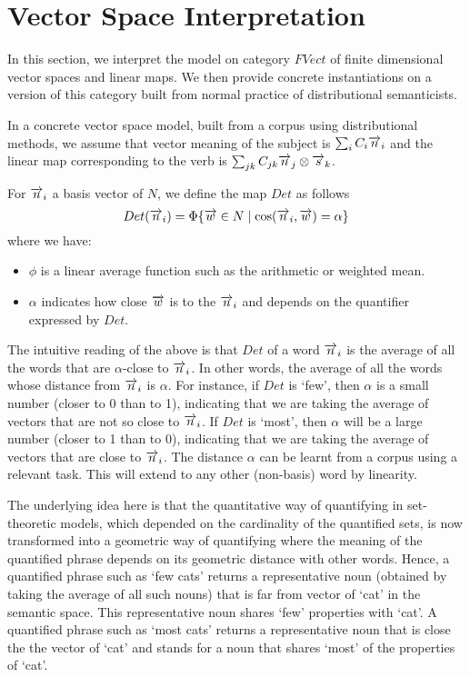 \section{Vector Space Interpretation}


In this section, we interpret the model on category $FVect$ of finite dimensional vector spaces and linear maps. We then provide concrete instantiations on a version of this category built from normal practice of distributional semanticists. 

In a concrete vector space model, built from a corpus using distributional methods, we assume that  vector meaning of the subject is $\sum_i C_i \overrightarrow{n}_i$ and the linear map corresponding to the verb is $\sum_{jk} C_{jk} \overrightarrow{n}_j \otimes \overrightarrow{s}_k$. 

For $\overrightarrow{n}_i$ a basis vector of $N$, we define  the map $Det$  as follows 
\[
Det(\overrightarrow{n}_i) = \Phi \{\overrightarrow{w} \in N \mid \cos(\overrightarrow{n}_i, \overrightarrow{w}) = \alpha\}
\]
where we have:
\begin{itemize}
\item  $\phi$ is a linear average function such as the   arithmetic or weighted mean. 
\item  $\alpha$ indicates how close $\overrightarrow{w}$ is to the $\overrightarrow{n}_i$ and depends on the quantifier expressed by $Det$. 
\end{itemize}

\noindent
The intuitive reading of the above is that $Det$ of a word $\overrightarrow{n}_i$ is the average of all the words that are $\alpha$-close to $\overrightarrow{n}_i$. In other words, the average of all the words  whose distance from $\overrightarrow{n}_i$ is $\alpha$.  For instance, if $Det$ is `few', then $\alpha$ is a small number (closer to 0 than to 1), indicating that we are taking the average of vectors that are not so close to $\overrightarrow{n}_i$. If $Det$ is `most', then $\alpha$ will be a large number (closer to 1 than to 0), indicating that we are taking the average of vectors that are close to $\overrightarrow{n}_i$. The distance $\alpha$ can be learnt from a corpus using a relevant task. This will extend to any other (non-basis) word by linearity. 

The underlying idea here is that the quantitative way of quantifying in set-theoretic models, which depended on the cardinality of the quantified sets, is now transformed into a geometric way of quantifying where the meaning of the quantified phrase depends on its geometric distance with other words. Hence, a quantified phrase such as `few cats' returns a representative noun (obtained by taking the average of all such nouns) that is far from vector of  `cat'  in the semantic space. This representative noun shares `few' properties with `cat'. A quantified phrase such as `most cats' returns a representative noun that is close the the vector of `cat' and stands for a noun that shares `most' of the properties of `cat'. 


